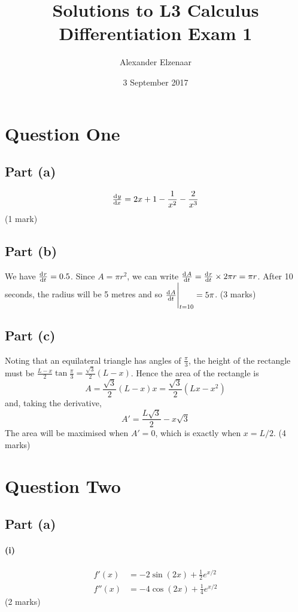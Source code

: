 \documentclass[a4paper]{report}
\title{Solutions to L3 Calculus Differentiation Exam 1}
\author{Alexander Elzenaar}
\date{3 September 2017}
\begin{document}
\maketitle

\section*{Question One}
\subsection*{Part (a)}
\begin{displaymath}
  \od{y}{x} = 2x + 1 - \frac{1}{x^2} - \frac{2}{x^3}
\end{displaymath}
(1 mark)

\subsection*{Part (b)}
We have $ \od{r}{t} = 0.5 $. Since $ A = \pi r^2 $, we can write $ \od{A}{t} = \od{r}{t} \times 2\pi r = \pi r $.
After 10 seconds, the radius will be 5 metres and so $ \eval{\od{A}{t}}_{t = 10} = 5\pi $.
(3 marks)

\subsection*{Part (c)}
Noting that an equilateral triangle has angles of $ \frac{\pi}{3} $, the height of the rectangle must
be $ \frac{L - x}{2} \tan \frac{\pi}{3} = \frac{\sqrt{3}}{2}(L - x) $. Hence the area of the rectangle is
\begin{displaymath}
  A = \frac{\sqrt{3}}{2}(L - x)x = \frac{\sqrt{3}}{2}(Lx - x^2)
\end{displaymath}
and, taking the derivative,
\begin{displaymath}
  A' = \frac{L\sqrt{3}}{2} - x\sqrt{3}
\end{displaymath}
The area will be maximised when $ A' = 0 $, which is exactly when $ x = L/2 $.
(4 marks)

\section*{Question Two}
\subsection*{Part (a)}
\paragraph{(i)}
\begin{align*}
  f'(x) &= -2\sin(2x) + \frac{1}{2} e^{x/2}\\
  f''(x) &= -4\cos(2x) + \frac{1}{4} e^{x/2}
\end{align*}
(2 marks)
\end{document}
